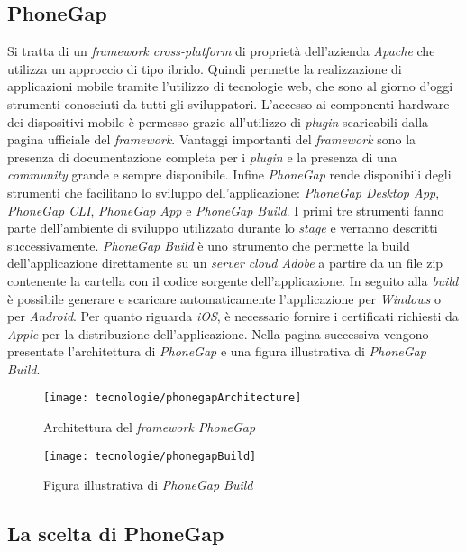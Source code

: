 \subsection{PhoneGap}

Si tratta di un \textit{framework cross-platform} di proprietà dell'azienda \textit{Apache} che utilizza un approccio di tipo ibrido. Quindi permette la realizzazione di applicazioni mobile tramite l'utilizzo di tecnologie web, che sono al giorno d'oggi strumenti conosciuti da tutti gli sviluppatori. L'accesso ai componenti hardware dei dispositivi mobile è permesso grazie all'utilizzo di \textit{plugin} scaricabili dalla pagina ufficiale del \textit{framework}. Vantaggi importanti del \textit{framework} sono la presenza di documentazione completa per i \textit{plugin} e la presenza di una \textit{community} grande e sempre disponibile. Infine \textit{PhoneGap} rende disponibili degli strumenti che facilitano lo sviluppo dell'applicazione: \textit{PhoneGap Desktop App}, \textit{PhoneGap CLI}, \textit{PhoneGap App} e \textit{PhoneGap Build}. I primi tre strumenti fanno parte dell'ambiente di sviluppo utilizzato durante lo \textit{stage} e verranno descritti successivamente. \textit{PhoneGap Build} è uno strumento che permette la build dell'applicazione direttamente su un \textit{server} \textit{cloud Adobe} a partire da un file zip contenente la cartella con il codice sorgente dell'applicazione. In seguito alla \textit{build} è possibile generare e scaricare automaticamente l'applicazione per \textit{Windows} o per \textit{Android}. Per quanto riguarda \textit{iOS}, è necessario fornire i certificati richiesti da \textit{Apple} per la distribuzione dell'applicazione. Nella pagina successiva vengono presentate l'architettura di \textit{PhoneGap} e una figura illustrativa di \textit{PhoneGap Build}.

\begin{figure}[!h] 
    \centering 
    \texttt{[image: tecnologie/phonegapArchitecture]} 
    \caption{Architettura del \textit{framework PhoneGap}}
\end{figure}

\begin{figure}[!h] 
    \centering 
    \texttt{[image: tecnologie/phonegapBuild]} 
    \caption{Figura illustrativa di \textit{PhoneGap Build}}
\end{figure}

\newpage


\subsection{La scelta di PhoneGap}

